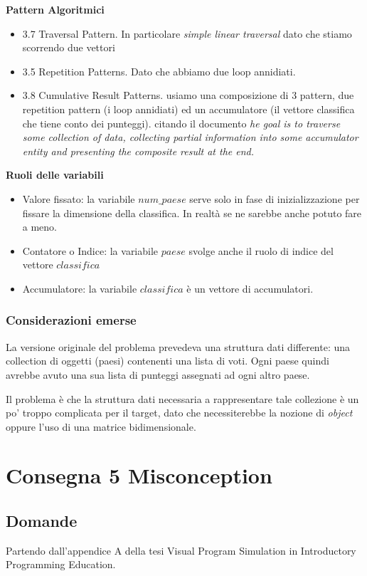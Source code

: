 \documentclass[a4paper]{article}
\begin{document}
\textbf{Pattern Algoritmici}
\begin{itemize}
	\item 3.7 Traversal Pattern. In particolare \textit{simple linear traversal} dato che stiamo scorrendo due vettori
	\item 3.5 Repetition Patterns. Dato che abbiamo due loop annidiati.
	\item 3.8 Cumulative Result Patterns. usiamo una composizione di 3 pattern, due repetition pattern (i loop annidiati) ed un accumulatore (il vettore classifica che tiene conto dei punteggi). citando il documento \cite{articolo} \textit{he goal is to traverse some collection of data, collecting partial information into some accumulator entity and presenting the composite result at the end.}

\end{itemize}
\textbf{Ruoli delle variabili}

\begin{itemize}
	\item Valore fissato: la variabile $num\_paese$ serve solo in fase di inizializzazione per fissare la dimensione della classifica. In realtà se ne sarebbe anche potuto fare a meno.
	\item Contatore o Indice: la variabile $paese$ svolge anche il ruolo di indice del vettore $classifica$
	\item Accumulatore: la variabile $classifica$ è un vettore di accumulatori.
\end{itemize}
\subsubsection{Considerazioni emerse}
La versione originale del problema prevedeva una struttura dati differente: una collection di oggetti (paesi) contenenti una lista di voti.
Ogni paese quindi avrebbe avuto una sua lista di punteggi assegnati ad ogni altro paese.

Il problema è che la struttura dati necessaria a rappresentare tale collezione è un po' troppo complicata per il target, dato che necessiterebbe la nozione di \textit{object} oppure l'uso di una matrice bidimensionale.
\section{Consegna 5 \large Misconception}

\subsection{Domande}
Partendo dall'appendice A della  tesi Visual Program Simulation in Introductory Programming Education.
\end{document}
